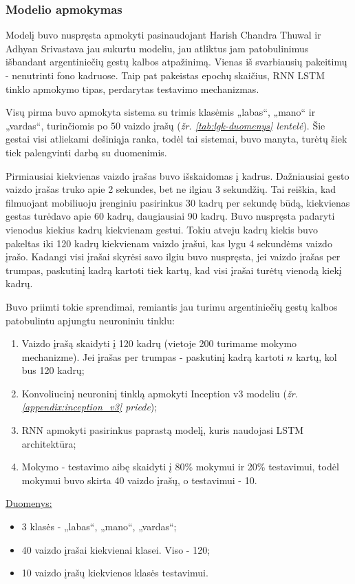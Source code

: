 \documentclass{VUMIFPSbakalaurinis}
\begin{document}
\subsubsection{Modelio apmokymas}

Modelį buvo nuspręsta apmokyti pasinaudojant Harish Chandra Thuwal ir Adhyan Srivastava jau sukurtu modeliu, jau atliktus jam patobulinimus išbandant argentiniečių gestų kalbos atpažinimą. Vienas iš svarbiausių pakeitimų - nenutrinti fono kadruose. Taip pat pakeistas epochų skaičius, RNN LSTM tinklo apmokymo tipas, perdarytas testavimo mechanizmas.

Visų pirma buvo apmokyta sistema su trimis klasėmis „labas“, „mano“ ir „vardas“, turinčiomis po 50 vaizdo įrašų (\textit{žr. \ref{tab:lgk-duomenys} lentelė}). Šie gestai visi atliekami dešiniąja ranka, todėl tai sistemai, buvo manyta, turėtų šiek tiek palengvinti darbą su duomenimis.

Pirmiausiai kiekvienas vaizdo įrašas buvo išskaidomas į kadrus. Dažniausiai gesto vaizdo įrašas truko apie 2 sekundes, bet ne ilgiau 3 sekundžių. Tai reiškia, kad filmuojant mobiliuoju įrenginiu pasirinkus 30 kadrų per sekundę būdą, kiekvienas gestas turėdavo apie 60 kadrų, daugiausiai 90 kadrų. Buvo nuspręsta padaryti vienodus kiekius kadrų kiekvienam gestui. Tokiu atveju kadrų kiekis buvo pakeltas iki 120 kadrų kiekvienam vaizdo įrašui, kas lygu 4 sekundėms vaizdo įrašo. Kadangi visi įrašai skyrėsi savo ilgiu buvo nuspręsta, jei vaizdo įrašas per trumpas, paskutinį kadrą kartoti tiek kartų, kad visi įrašai turėtų vienodą kiekį kadrų. 

Buvo priimti tokie sprendimai, remiantis jau turimu argentiniečių gestų kalbos patobulintu apjungtu neuroniniu tinklu:
\begin{enumerate}
	\item Vaizdo įrašą skaidyti į 120 kadrų (vietoje 200 turimame mokymo mechanizme). Jei įrašas per trumpas - paskutinį kadrą kartoti $n$ kartų, kol bus 120 kadrų;
	\item Konvoliucinį neuroninį tinklą apmokyti Inception v3 modeliu (\textit{žr. \ref{appendix:inception_v3} priede});
	\item RNN apmokyti pasirinkus paprastą modelį, kuris naudojasi LSTM architektūra;
	\item Mokymo - testavimo aibę skaidyti į 80\% mokymui ir 20\% testavimui, todėl mokymui buvo skirta 40 vaizdo įrašų, o testavimui - 10.
\end{enumerate}

\underline{Duomenys:}
\begin{itemize}
	\item 3 klasės - „labas“, „mano“, „vardas“;
	\item 40 vaizdo įrašai kiekvienai klasei. Viso - 120;
	\item 10 vaizdo įrašų kiekvienos klasės testavimui. 
\end{itemize}
\end{document}
